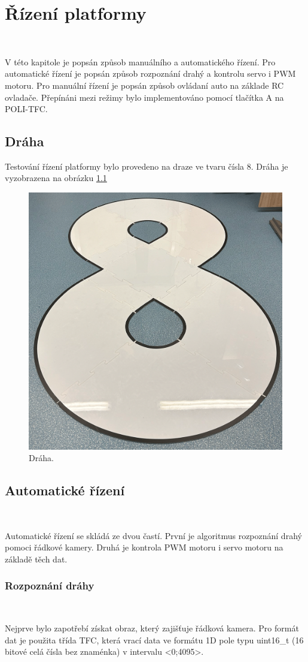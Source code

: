 \chapter{Řízení platformy}
\label{sec:PlatformControl}
\

V této kapitole je popsán způsob manuálního a automatického řízení.
Pro automatické řízení je popsán
způsob rozpoznání drahý a kontrolu servo i PWM motoru. 
Pro manuální řízení je popsán způsob ovládaní auto na základe RC
ovladače. Přepínáni mezi režimy bylo implementováno
pomocí tlačítka A na POLI-TFC.

\section{Dráha}
Testování řízení platformy bylo provedeno na draze ve tvaru čísla 8.
Dráha je vyzobrazena na obrázku \ref{fig:Road}

\begin{figure}[!h]
    \centering
    \includegraphics[width = 0.5\linewidth]{Figures/Road.png}
    \caption{Dráha.}
    \label{fig:Road}
\end{figure}

\section{Automatické řízení}\

Automatické řízení se skládá ze dvou častí. První je algoritmus 
rozpoznání drahý pomoci řádkové kamery. Druhá je kontrola PWM motoru i servo motoru na základě těch dat.

\subsection{Rozpoznání dráhy}\

Nejprve bylo zapotřebí získat obraz, který zajišťuje řádková kamera.
Pro formát dat je použita třída TFC\cite{draha}, která vrací data ve formátu 1D pole
typu uint16\_t (16 bitové celá čísla bez znaménka) v intervalu <0;4095>.

